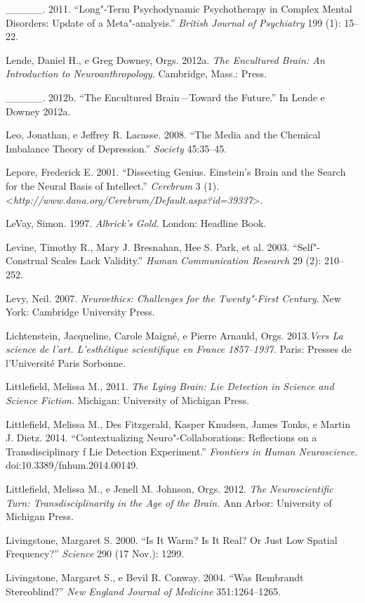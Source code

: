 {\begin{Parskip}
\_\_\_\_\_. 2011. ``Long"-Term Psychodynamic Psychotherapy in Complex
Mental Disorders: Update of a Meta"-analysis.'' \emph{British Journal of
Psychiatry} 199 (1): 15--22.

Lende, Daniel H., e Greg Downey, Orgs. 2012a. \emph{The Encultured
Brain: An Introduction to Neuroanthropology.} Cambridge, Mass.: 
Press.

\_\_\_\_\_. 2012b. ``The Encultured Brain---Toward the Future.'' In Lende
e Downey 2012a.

Leo, Jonathan, e Jeffrey R. Lacasse. 2008. ``The Media and the Chemical
Imbalance Theory of Depression.'' \emph{Society} 45:35--45.

Lepore, Frederick E. 2001. ``Dissecting Genius. Einstein's Brain and the
Search for the Neural Basis of Intellect.'' \emph{Cerebrum} 3 (1).
\textless{}\emph{http://www.dana.org/Cerebrum/Default.aspx?id​=39337}\textgreater{}.

LeVay, Simon. 1997. \emph{Albrick's Gold}. London: Headline Book.

Levine, Timothy R., Mary J. Bresnahan, Hee S. Park, et al. 2003.
``Self"-Construal Scales Lack Validity.'' \emph{Human Communication
Research} 29 (2): 210--252.

Levy, Neil. 2007. \emph{Neuroethics: Challenges for the Twenty"-First
Century}. New York: Cambridge University Press.

Lichtenstein, Jacqueline, Carole Maigné, e Pierre Arnauld, Orgs.
2013.\emph{Vers La science de l'art. L'esthétique scientifique en France
1857--1937.} Paris: Presses de l'Université Paris Sorbonne.

Littlefield, Melissa M., 2011. \emph{The Lying Brain: Lie Detection in
Science and Science Fiction}. Michigan: University of Michigan Press.

Littlefield, Melissa M., Des Fitzgerald, Kasper Knudsen, James Tonks, e
Martin J. Dietz. 2014. ``Contextualizing Neuro"-Collaborations:
Reflections on a Transdisciplinary f Lie Detection Experiment.''
\emph{Frontiers in Human Neuroscience}. doi:10.3389/fnhum.2014.00149.

Littlefield, Melissa M., e Jenell M. Johnson, Orgs. 2012. \emph{The
Neuroscientific Turn: Transdisciplinarity in the Age of the Brain.} Ann
Arbor: University of Michigan Press.

Livingstone, Margaret S. 2000. ``Is It Warm? Is It Real? Or Just Low
Spatial Frequency?'' \emph{Science} 290 (17 Nov.): 1299.

Livingstone, Margaret S., e Bevil R. Conway. 2004. ``Was Rembrandt
Stereoblind?'' \emph{New England Journal of Medicine} 351:1264--1265.


\end{Parskip}}
